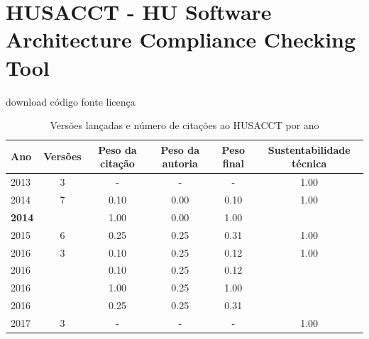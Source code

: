 \section{HUSACCT - HU Software Architecture Compliance Checking Tool}
\checkmark download
\checkmark código fonte
\checkmark licença


\begin{table}[H]
\caption{Versões lançadas e número de citações ao HUSACCT por ano}
\centering
\begin{tabular}{| l | c | c | c | c | c |}
  \hline
  Ano & Versões & Peso da citação & Peso da autoria & Peso final & Sustentabilidade técnica \\
  \hline
        2013 & 3 & - & - & -
        &
          {\color{blue} 1.00}
        \\
\hline
            2014
          &
          7
          &
          0.10
          &
          0.00
          &
          0.10
          &
            {\color{blue} 1.00}
          \\
            {\bf 2014}
          &
          
          &
          1.00
          &
          0.00
          &
          1.00
          &
          \\
\hline
            2015
          &
          6
          &
          0.25
          &
          0.25
          &
          0.31
          &
            {\color{blue} 1.00}
          \\
\hline
            2016
          &
          3
          &
          0.10
          &
          0.25
          &
          0.12
          &
            {\color{blue} 1.00}
          \\
            2016
          &
          
          &
          0.10
          &
          0.25
          &
          0.12
          &
          \\
            2016
          &
          
          &
          1.00
          &
          0.25
          &
          1.00
          &
          \\
            2016
          &
          
          &
          0.25
          &
          0.25
          &
          0.31
          &
          \\
\hline
        2017 & 3 & - & - & -
        &
          {\color{blue} 1.00}
        \\
\hline
\end{tabular}
\end{table}

